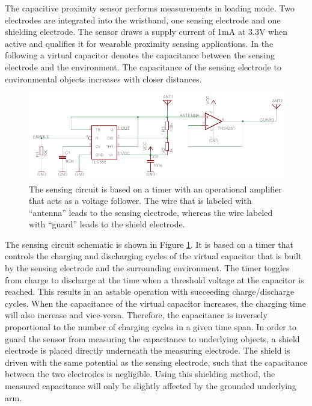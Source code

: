 \documentclass[runningheads,a4paper]{llncs}
\begin{document}
The capacitive proximity sensor performs measurements in loading mode. Two electrodes are integrated into the wristband, one sensing electrode and one shielding electrode. The sensor draws a supply current of 1mA at 3.3V when active and qualifies it for wearable proximity sensing applications. In the following a virtual capacitor denotes the capacitance between the sensing electrode and the environment. The capacitance of the sensing electrode to environmental objects increases with closer distances.

\begin{figure}
	\centering
		\includegraphics[width=1.00\textwidth]{Images/schematic.pdf}
	\caption{The sensing circuit is based on a timer with an operational amplifier that acts as a voltage follower. The wire that is labeled with ``antenna'' leads to the sensing electrode, whereas the wire labeled with ``guard'' leads to the shield electrode.}
	\label{fig:schematic}
\end{figure}

The sensing circuit schematic is shown in Figure \ref{fig:schematic}. It is based on a timer that controls the charging and discharging cycles of the virtual capacitor that is built by the sensing electrode and the surrounding environment. The timer toggles from charge to discharge at the time when a threshold voltage at the capacitor is reached. This results in an astable operation with succeeding charge/discharge cycles. When the capacitance of the virtual capacitor increases, the charging time will also increase and vice-versa.
Therefore, the capacitance is inversely proportional to the number of charging cycles in a given time span. In order to guard the sensor from measuring the capacitance to underlying objects, a shield electrode is placed directly underneath the measuring electrode. The shield is driven with the same potential as the sensing electrode, such that the capacitance between the two electrodes is negligible. Using this shielding method, the measured capacitance will only be slightly affected by the grounded underlying arm.
\end{document}
